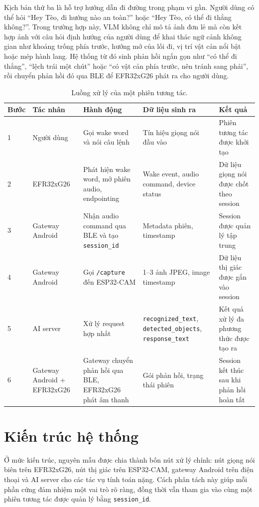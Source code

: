 \documentclass[11pt,a4paper]{article}
\begin{document}
Kịch bản thứ ba là hỗ trợ hướng dẫn đi đường trong phạm vi gần. Người dùng có thể hỏi ``Hey Tèo, đi hướng nào an toàn?'' hoặc ``Hey Tèo, có thể đi thẳng không?''. Trong trường hợp này, VLM không chỉ mô tả ảnh đơn lẻ mà còn kết hợp ảnh với câu hỏi định hướng của người dùng để khai thác ngữ cảnh không gian như khoảng trống phía trước, hướng mở của lối đi, vị trí vật cản nổi bật hoặc mép hành lang. Hệ thống từ đó sinh phản hồi ngắn gọn như ``có thể đi thẳng'', ``lệch trái một chút'' hoặc ``có vật cản phía trước, nên tránh sang phải'', rồi chuyển phản hồi đó qua BLE để EFR32xG26 phát ra cho người dùng.

\begin{table}[H]
\centering
\caption{Luồng xử lý của một phiên tương tác.}
\begin{tabularx}{\textwidth}{p{1.2cm}p{2.4cm}p{3.8cm}p{3.2cm}Y}
\toprule
\textbf{Bước} & \textbf{Tác nhân} & \textbf{Hành động} & \textbf{Dữ liệu sinh ra} & \textbf{Kết quả} \\
 & Người dùng & Gọi wake word và nói câu lệnh & Tín hiệu giọng nói đầu vào & Phiên tương tác được khởi tạo \\
2 & EFR32xG26 & Phát hiện wake word, mở phiên audio, endpointing & Wake event, audio command, device status & Dữ liệu giọng nói được chốt theo session \\
3 & Gateway Android & Nhận audio command qua BLE và tạo \texttt{session\_id} & Metadata phiên, timestamp & Session được quản lý tập trung \\
4 & Gateway Android & Gọi \texttt{/capture} đến ESP32-CAM & 1--3 ảnh JPEG, image timestamp & Dữ liệu thị giác được gắn vào session \\
5 & AI server & Xử lý request hợp nhất & \texttt{recognized\_text}, \texttt{detected\_objects}, \texttt{response\_text} & Kết quả xử lý đa phương thức được tạo ra \\
6 & Gateway Android + EFR32xG26 & Gateway chuyển phản hồi qua BLE, EFR32xG26 phát âm thanh & Gói phản hồi, trạng thái phiên & Session kết thúc sau khi phản hồi hoàn tất \\
\bottomrule
\end{tabularx}
\end{table}


\section{Kiến trúc hệ thống}
Ở mức kiến trúc, nguyên mẫu được chia thành bốn nút xử lý chính: nút giọng nói biên trên EFR32xG26, nút thị giác trên ESP32-CAM, gateway Android trên điện thoại và AI server cho các tác vụ tính toán nặng. Cách phân tách này giúp mỗi phần cứng đảm nhiệm một vai trò rõ ràng, đồng thời vẫn tham gia vào cùng một phiên tương tác được quản lý bằng \texttt{session\_id}.
\end{document}
